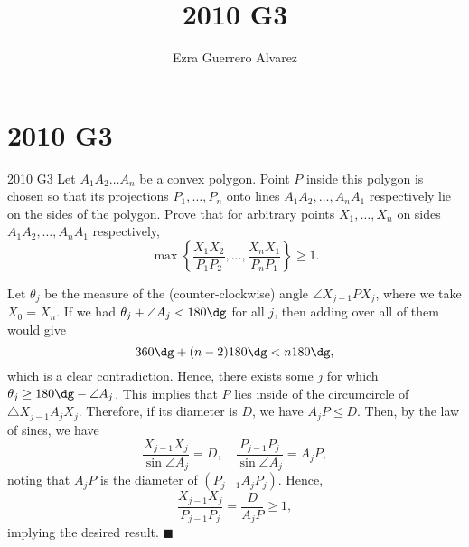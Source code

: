 \documentclass[14pt]{article}
\title{2010 G3}
\author{Ezra Guerrero Alvarez}
\begin{document}
\maketitle
	
\section*{2010 G3}

\begin{statement}{2010 G3}
	Let $A_1A_2 \ldots A_n$ be a convex polygon. Point $P$ inside this polygon is chosen so that its projections $P_1, \ldots , P_n$ onto lines $A_1A_2, \ldots , A_nA_1$ respectively lie on the sides of the polygon. Prove that for arbitrary points $X_1, \ldots , X_n$ on sides $A_1A_2, \ldots , A_nA_1$ respectively,
	\[ \max \left\{ \frac{X_1X_2}{P_1P_2}, \ldots, \frac{X_nX_1}{P_nP_1} \right\} \geq 1. \]
\end{statement}
Let $\theta_j$ be the measure of the (counter-clockwise) angle $\angle X_{j-1}PX_j$, where we take $X_0=X_n$. If we had $\theta_j+\angle A_j<180\dg$ for all $j$, then adding over all of them would give
\[ 360\dg+(n-2)180\dg<n180\dg, \]
which is a clear contradiction. Hence, there exists some $j$ for which $\theta_j\ge180\dg-\angle A_j$. This implies that $P$ lies inside of the circumcircle of $\triangle X_{j-1}A_jX_j$. Therefore, if its diameter is $D$, we have $A_jP\le D$. Then, by the law of sines, we have
\[ \frac{X_{j-1}X_j}{\sin\angle A_j}=D,\quad \frac{P_{j-1}P_j}{\sin\angle A_j}=A_jP, \]
noting that $A_jP$ is the diameter of $(P_{j-1}A_jP_j)$. Hence,
\[ \frac{X_{j-1}X_j}{P_{j-1}P_j}=\frac D{A_jP}\ge 1, \]
implying the desired result. $\blacksquare$
	
\end{document}
